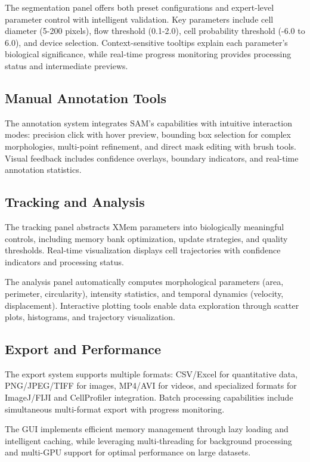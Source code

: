 \documentclass[12pt]{article}
\begin{document}
The segmentation panel offers both preset configurations and expert-level parameter control with intelligent validation. Key parameters include cell diameter (5-200 pixels), flow threshold (0.1-2.0), cell probability threshold (-6.0 to 6.0), and device selection. Context-sensitive tooltips explain each parameter's biological significance, while real-time progress monitoring provides processing status and intermediate previews.

\subsection{Manual Annotation Tools}


The annotation system integrates SAM's capabilities with intuitive interaction modes: precision click with hover preview, bounding box selection for complex morphologies, multi-point refinement, and direct mask editing with brush tools. Visual feedback includes confidence overlays, boundary indicators, and real-time annotation statistics.

\subsection{Tracking and Analysis}

The tracking panel abstracts XMem parameters into biologically meaningful controls, including memory bank optimization, update strategies, and quality thresholds. Real-time visualization displays cell trajectories with confidence indicators and processing status.

The analysis panel automatically computes morphological parameters (area, perimeter, circularity), intensity statistics, and temporal dynamics (velocity, displacement). Interactive plotting tools enable data exploration through scatter plots, histograms, and trajectory visualization.

\subsection{Export and Performance}


The export system supports multiple formats: CSV/Excel for quantitative data, PNG/JPEG/TIFF for images, MP4/AVI for videos, and specialized formats for ImageJ/FIJI and CellProfiler integration. Batch processing capabilities include simultaneous multi-format export with progress monitoring.

The GUI implements efficient memory management through lazy loading and intelligent caching, while leveraging multi-threading for background processing and multi-GPU support for optimal performance on large datasets.
\end{document}
